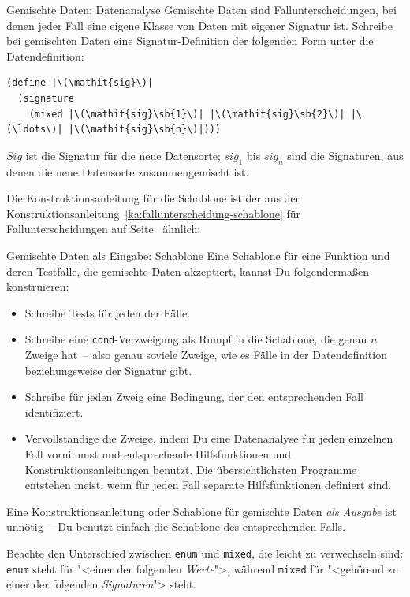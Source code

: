 \begin{konstruktionsanleitung}{Gemischte Daten: Datenanalyse}
  \label{ka:gemischt-datenanalyse}
  Gemischte Daten sind Fallunterscheidungen, bei denen jeder Fall eine
  eigene Klasse von Daten mit eigener Signatur ist.
  Schreibe bei gemischten Daten eine Signatur-Definition der folgenden Form unter die
  Datendefinition:
%
\begin{lstlisting}
(define |\(\mathit{sig}\)|
  (signature
    (mixed |\(\mathit{sig}\sb{1}\)| |\(\mathit{sig}\sb{2}\)| |\(\ldots\)| |\(\mathit{sig}\sb{n}\)|)))
\end{lstlisting}
$\mathit{Sig}$ ist die Signatur für die neue Datensorte; $\mathit{sig}_1$ bis $\textit{sig}_n$
sind die Signaturen, aus denen die neue
Datensorte zusammengemischt ist.
\end{konstruktionsanleitung}
%
\noindent Die Konstruktionsanleitung für die Schablone ist der aus
der Konstruktionsanleitung~\ref{ka:fallunterscheidung-schablone} für
Fallunterscheidungen auf
Seite~\pageref{ka:fallunterscheidung-schablone} ähnlich:
%
\begin{konstruktionsanleitung}{Gemischte Daten als Eingabe:
    Schablone}
  \label{ka:gemischt-eingabe-schablone}
Eine Schablone für eine Funktion und deren Testfälle, die gemischte
Daten akzeptiert, kannst Du folgendermaßen konstruieren:
%
\begin{itemize}
\item Schreibe Tests für jeden der Fälle.
\item  Schreibe eine \lstinline{cond}-Verzweigung als Rumpf in die
  Schablone, die genau $n$ Zweige hat~-- also genau soviele Zweige,
  wie es Fälle in der Datendefinition beziehungsweise der Signatur gibt.
\item Schreibe für jeden Zweig eine Bedingung, der den entsprechenden
  Fall identifiziert.
\item Vervollständige die Zweige, indem Du eine Datenanalyse für
  jeden einzelnen Fall vornimmst und entsprechende Hilfsfunktionen
  und Konstruktionsanleitungen benutzt.
  Die übersichtlichsten Programme entstehen meist, wenn für jeden Fall
  separate Hilfsfunktionen definiert sind.\label{page:separate-mixed-procs}
\end{itemize}
%
\end{konstruktionsanleitung}
%
Eine Konstruktionsanleitung oder Schablone für gemischte Daten
\emph{als Ausgabe} ist unnötig~-- Du benutzt einfach die Schablone
des entsprechenden Falls.

Beachte den Unterschied zwischen \lstinline{enum} und
\lstinline{mixed}, die leicht zu verwechseln sind: \lstinline{enum} steht
für "<einer der folgenden \emph{Werte}">, während \lstinline{mixed} für
"<gehörend zu einer der folgenden \emph{Signaturen}"> steht.

